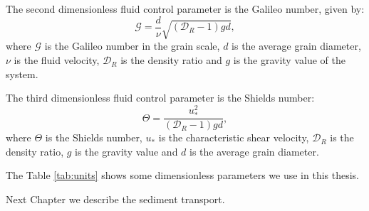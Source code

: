     The second dimensionless fluid control parameter is the Galileo number, given by:
\begin{equation}
    \label{equ:Reynolds}
    \mathcal{G} = \frac{d}{\nu}\sqrt{\left(\mathcal{D}_{R}-1\right)gd},
\end{equation}
where $\mathcal{G}$ is the Galileo number in the grain scale, $d$ is the average grain diameter, $\nu$ is the fluid velocity, $\mathcal{D}_{R}$ is the density ratio and $g$ is the gravity value of the system.

    The third dimensionless fluid control parameter is the Shields number:
\begin{equation}
    \label{equ:Shields}
    \Theta = \frac{u_{*}^{2}}{\left(\mathcal{D}_{R}-1\right)gd},
\end{equation}
where $\Theta$ is the Shields number, $u_{*}$ is the characteristic shear velocity, $\mathcal{D}_{R}$ is the density ratio, $g$ is the gravity value and $d$ is the average grain diameter.

    The Table \ref{tab:units} shows some dimensionless parameters we use in this thesis.



    Next Chapter we describe the sediment transport.
